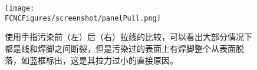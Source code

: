\begin{figure}[H]
\centering
\texttt{[image: \\FCNCFigures/screenshot/panelPull.png]}
\caption{使用手指污染前（左）后（右）拉线的比较，可以看出大部分情况下都是线和焊脚之间断裂，但是污染过的表面上有焊脚整个从表面脱落，如蓝框标出，这是其拉力过小的直接原因。}
\label{fig:panelPull}
\end{figure}